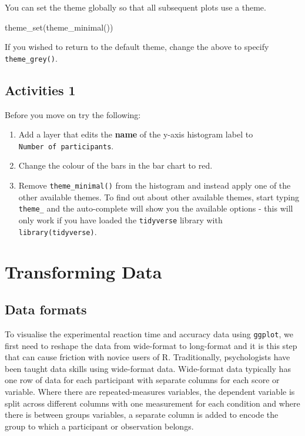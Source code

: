 \documentclass[
  english,
  doc,floatsintext]{apa6}
\newenvironment{Shaded}{\begin{snugshade}}{\end{snugshade}}
\newcommand{\FunctionTok}[1]{\textcolor[rgb]{0.00,0.00,0.00}{#1}}
\newcommand{\NormalTok}[1]{#1}
\begin{document}
You can set the theme globally so that all subsequent plots use a theme.

\begin{Shaded}
\begin{Highlighting}[]
\FunctionTok{theme\_set}\NormalTok{(}\FunctionTok{theme\_minimal}\NormalTok{())}
\end{Highlighting}
\end{Shaded}

If you wished to return to the default theme, change the above to specify \texttt{theme\_grey()}.

\hypertarget{activities-1}{%
\subsection{Activities 1}\label{activities-1}}

Before you move on try the following:

\begin{enumerate}
\def\labelenumi{\arabic{enumi}.}
\item
  Add a layer that edits the \textbf{name} of the y-axis histogram label to \texttt{Number\ of\ participants}.
\item
  Change the colour of the bars in the bar chart to red.
\item
  Remove \texttt{theme\_minimal()} from the histogram and instead apply one of the other available themes. To find out about other available themes, start typing \texttt{theme\_} and the auto-complete will show you the available options - this will only work if you have loaded the \texttt{tidyverse} library with \texttt{library(tidyverse)}.
\end{enumerate}

\hypertarget{transforming-data}{%
\section{Transforming Data}\label{transforming-data}}

\hypertarget{data-formats}{%
\subsection{Data formats}\label{data-formats}}

To visualise the experimental reaction time and accuracy data using \texttt{ggplot}, we first need to reshape the data from wide-format to long-format and it is this step that can cause friction with novice users of R. Traditionally, psychologists have been taught data skills using wide-format data. Wide-format data typically has one row of data for each participant with separate columns for each score or variable. Where there are repeated-measures variables, the dependent variable is split across different columns with one measurement for each condition and where there is between groups variables, a separate column is added to encode the group to which a participant or observation belongs.
\end{document}

